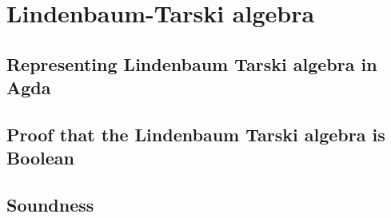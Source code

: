 \documentclass[titlepage]{article}
\begin{document}

\section{Lindenbaum-Tarski algebra}

\subsection{Representing Lindenbaum Tarski algebra in Agda}
\subsection{Proof that the Lindenbaum Tarski algebra is Boolean}
\subsection{Soundness}

\newpage

\end{document}
